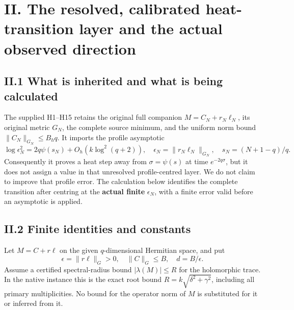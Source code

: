 \section{II. The resolved, calibrated heat-transition layer and the actual observed direction}\label{ii.-the-resolved-calibrated-heat-transition-layer-and-the-actual-observed-direction}

\subsection{II.1 What is inherited and what is being calculated}\label{ii.1-what-is-inherited-and-what-is-being-calculated}

The supplied H1--H15 retains the original full companion \(M=C_N+r_N\ell_N\), its original metric \(G_N\), the complete source minimum, and the uniform norm bound \(\|C_N\|_{G_N}\le B_hq\). It imports the profile asymptotic \[
 \log\epsilon_N^2=2q\psi(s_N)+O_h(k\log^2(q+2)),\quad
 \epsilon_N=\|r_N\ell_N\|_{G_N},\quad s_N=(N+1-q)/q.
\] Consequently it proves a heat step away from \(\sigma=\psi(s)\) at time \(e^{-2q\sigma}\), but it does not assign a value in that unresolved profile-centred layer. We do not claim to improve that profile error. The calculation below identifies the complete transition after centring at the \textbf{actual finite} \(\epsilon_N\), with a finite error valid before an asymptotic is applied.

\subsection{II.2 Finite identities and constants}\label{ii.2-finite-identities-and-constants}

Let \(M=C+r\ell\) on the given \(q\)-dimensional Hermitian space, and put \[
 \epsilon=\|r\ell\|_G>0,\quad \|C\|_G\le B,\quad
 d=B/\epsilon.
\] Assume a certified spectral-radius bound \(|\lambda(M)|\le R\) for the holomorphic trace. In the native instance this is the exact root bound \(R=k\sqrt{\delta^2+\gamma^2}\), including all primary multiplicities. No bound for the operator norm of \(M\) is substituted for it or inferred from it.

